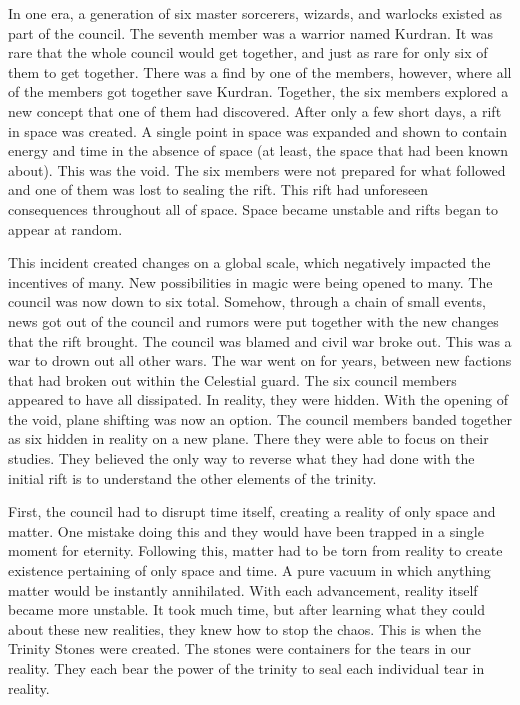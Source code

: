 \documentclass[letterpaper,10pt,twoside,twocolumn,openany]{book}
\begin{document}
In one era, a generation of six master sorcerers, wizards, and warlocks existed as part of the council. The seventh member was a warrior named Kurdran. It was rare that the whole council would get together, and just as rare for only six of them to get together. There was a find by one of the members, however, where all of the members got together save Kurdran. Together, the six members explored a new concept that one of them had discovered. After only a few short days, a rift in space was created. A single point in space was expanded and shown to contain energy and time in the absence of space (at least, the space that had been known about). This was the void. The six members were not prepared for what followed and one of them was lost to sealing the rift. This rift had unforeseen consequences throughout all of space. Space became unstable and rifts began to appear at random.

This incident created changes on a global scale, which negatively impacted the incentives of many. New possibilities in magic were being opened to many. The council was now down to six total. Somehow, through a chain of small events, news got out of the council and rumors were put together with the new changes that the rift brought. The council was blamed and civil war broke out. This was a war to drown out all other wars. The war went on for years, between new factions that had broken out within the Celestial guard. The six council members appeared to have all dissipated. In reality, they were hidden. With the opening of the void, plane shifting was now an option. The council members banded together as six hidden in reality on a new plane. There they were able to focus on their studies. They believed the only way to reverse what they had done with the initial rift is to understand the other elements of the trinity. 

First, the council had to disrupt time itself, creating a reality of only space and matter. One mistake doing this and they would have been trapped in a single moment for eternity. Following this, matter had to be torn from reality to 
create existence pertaining of only space and time. A pure vacuum in which anything matter would be instantly annihilated. With each advancement, reality itself became more unstable. It took much time, but after learning what they could about these new realities, they knew how to stop the chaos. This is when the Trinity Stones were created. The stones were containers for the tears in our reality. They each bear the power of the trinity to seal each individual tear in reality.
\end{document}
